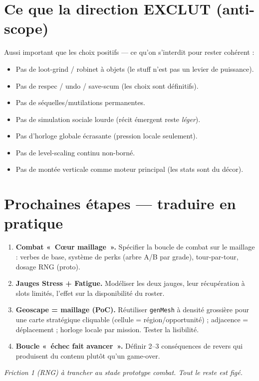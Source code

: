 \documentclass[11pt,a4paper]{article}
\begin{document}
\section{Ce que la direction EXCLUT (anti-scope)}
Aussi important que les choix positifs --- ce qu'on s'interdit pour rester cohérent :
\begin{itemize}
\item Pas de loot-grind / robinet à objets (le stuff n'est pas un levier de puissance).
\item Pas de respec / undo / save-scum (les choix sont définitifs).
\item Pas de séquelles/mutilations permanentes.
\item Pas de simulation sociale lourde (récit émergent reste \emph{léger}).
\item Pas d'horloge globale écrasante (pression locale seulement).
\item Pas de level-scaling continu non-borné.
\item Pas de montée verticale comme moteur principal (les stats sont du décor).
\end{itemize}

\section{Prochaines étapes --- traduire en pratique}
\begin{enumerate}
\item \textbf{Combat «~Cœur maillage~».} Spécifier la boucle de combat sur le maillage : verbes de base, système de perks (arbre A/B par grade), tour-par-tour, dosage RNG (proto).
\item \textbf{Jauges Stress + Fatigue.} Modéliser les deux jauges, leur récupération à slots limités, l'effet sur la disponibilité du roster.
\item \textbf{Geoscape = maillage (PoC).} Réutiliser \texttt{genMesh} à densité grossière pour une carte stratégique cliquable (cellule = région/opportunité) ; adjacence = déplacement ; horloge locale par mission. Tester la lisibilité.
\item \textbf{Boucle «~échec fait avancer~».} Définir 2--3 conséquences de revers qui produisent du contenu plutôt qu'un game-over.
\end{enumerate}

\begin{center}\small\itshape
Friction 1 (RNG) à trancher au stade prototype combat. Tout le reste est figé.
\end{center}
\end{document}
